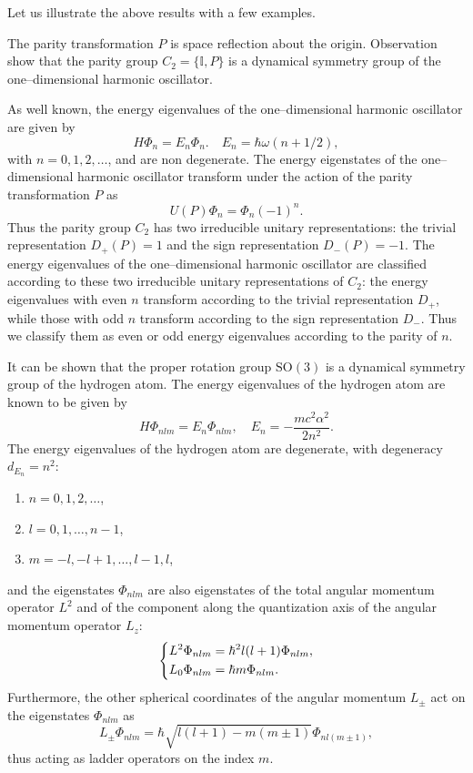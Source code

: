 Let us illustrate the above results with a few examples.

\begin{example}
    The parity transformation \(P\) is space reflection about the origin. Observation show that the parity group \(C_2 = \{\mathbb{I},P\}\) is a dynamical symmetry group of the one–dimensional harmonic oscillator.

    As well known, the energy eigenvalues of the one–dimensional harmonic oscillator are given by
    \[
        H \Phi_n = E_n \Phi_n. \quad E_n = \hbar \omega (n + 1/2),
    \]
    with \(n = 0, 1, 2, \ldots\), and are non degenerate. The energy eigenstates of the one–dimensional harmonic oscillator transform under the action of the parity transformation \(P\) as
    \[
        U(P) \Phi_n = \Phi_n (-1)^n.
    \]
    Thus the parity group \(C_2\) has two irreducible unitary representations: the trivial representation \(D_+(P) = 1\) and the sign representation \(D_-(P) = -1\). The energy eigenvalues of the one–dimensional harmonic oscillator are classified according to these two irreducible unitary representations of \(C_2\): the energy eigenvalues with even \(n\) transform according to the trivial representation \(D_+\), while those with odd \(n\) transform according to the sign representation \(D_-\). Thus we classify them as even or odd energy eigenvalues according to the parity of \(n\).
\end{example}

\begin{example}
    It can be shown that the proper rotation group \(\mathrm{SO}(3)\) is a dynamical symmetry group of the hydrogen atom. The energy eigenvalues of the hydrogen atom are known to be given by
    \[
        H \Phi_{n l m} = E_n \Phi_{n l m}, \quad E_n = -\frac{m c^2 \alpha^2}{2 n^2}.
    \]
    The energy eigenvalues of the hydrogen atom are degenerate, with degeneracy \(d_{E_n} = n^2\):
    \begin{enumerate}
        \item \(n = 0, 1, 2, \ldots\),
        \item \(l = 0, 1, \ldots, n-1\),
        \item \(m = -l, -l+1, \ldots, l-1, l\),
    \end{enumerate}
\end{example}
and the eigenstates \(\Phi_{n l m}\) are also eigenstates of the total angular momentum operator \(L^2\) and of the component along the quantization axis of the angular momentum operator \(L_z\):
\[
    \begin{dcases}
        L^2 \Phi_{n l m} = \hbar^2 l(l+1) \Phi_{n l m}, \\
        L_0 \Phi_{n l m} = \hbar m \Phi_{n l m}.
    \end{dcases}
\]
Furthermore, the other spherical coordinates of the angular momentum \(L_{\pm}\) act on the eigenstates \(\Phi_{n l m}\) as
\[
    L_{\pm} \Phi_{n l m} = \hbar \sqrt{l(l+1) - m(m \pm 1)} \Phi_{n l (m \pm 1)},
\]
thus acting as ladder operators on the index \(m\).

